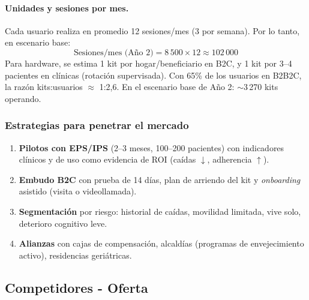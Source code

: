 \paragraph{Unidades y sesiones por mes.} Cada usuario realiza en promedio 12 sesiones/mes (3 por semana). Por lo tanto, en escenario base:
\[
\text{Sesiones/mes (Año 2)} = 8\,500 \times 12 \approx 102\,000
\]
Para hardware, se estima 1 kit por hogar/beneficiario en B2C, y 1 kit por 3--4 pacientes en clínicas (rotación supervisada). Con 65\% de los usuarios en B2B2C, la razón kits:usuarios $\approx$ 1:2,6. En el escenario base de Año 2: $\sim$3\,270 kits operando.

\subsubsection{Estrategias para penetrar el mercado}
\begin{enumerate}
    \item \textbf{Pilotos con EPS/IPS} (2--3 meses, 100--200 pacientes) con indicadores clínicos y de uso como evidencia de ROI (caídas $\downarrow$, adherencia $\uparrow$).
    \item \textbf{Embudo B2C} con prueba de 14 días, plan de arriendo del kit y \emph{onboarding} asistido (visita o videollamada).
    \item \textbf{Segmentación} por riesgo: historial de caídas, movilidad limitada, vive solo, deterioro cognitivo leve.
    \item \textbf{Alianzas} con cajas de compensación, alcaldías (programas de envejecimiento activo), residencias geriátricas.
\end{enumerate}

\subsection{Competidores - Oferta}

